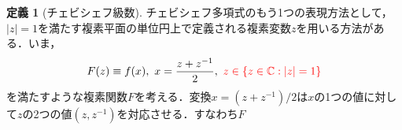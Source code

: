 \documentclass[11pt,a4paper]{jsarticle}
\theoremstyle{definition}
\newtheorem{dfn}{定義}
\begin{document}
\begin{dfn}[チェビシェフ級数]
  チェビシェフ多項式のもう1つの表現方法として，$|z|=1$を満たす複素平面の単位円上で定義される複素変数$z$を用いる方法がある．いま，
  \begin{equation*}
    F(z) \equiv f(x),\ x=\frac{z+z^{-1}}{2},\ \textcolor{red}{z\in\{z\in\mathbb{C}:|z|=1\}}
  \end{equation*}
  を満たすような複素関数$F$を考える．変換$x=(z+z^{-1})/2$は$x$の1つの値に対して$z$の2つの値$(z,z^{-1})$を対応させる．すなわち$F$
\end{dfn}



\begin{comment}
\mathcal{L}(X,Y)
点列$(A_n)$
\end{comment}


\end{document}
